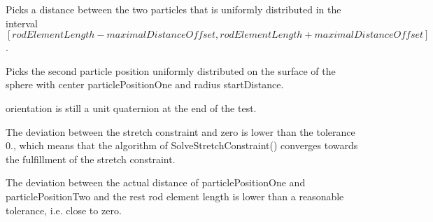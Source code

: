 \begin{DoxyRefList}
Picks a distance between the two particles that is uniformly distributed in the interval $ [rodElementLength - maximalDistanceOffset, rodElementLength + maximalDistanceOffset] $. 



Picks the second particle position uniformly distributed on the surface of the sphere with center {\ttfamily particle\+Position\+One} and radius {\ttfamily start\+Distance}.  
\item[Member \mbox{\hyperlink{class_unit_test___solve_stretch_constraint_ad5754f90b4c4d4be355e60b6180bf975}{Unit\+Test\+\_\+\+Solve\+Stretch\+Constraint.Test\+\_\+\+Solve\+Stretch\+Constraint}} (int iterations, Vector3 particle\+Position\+One, Vector3 particle\+Position\+Two, BSM.\+Quaternion orientation, \mbox{\hyperlink{class_guidewire_sim_1_1_math_helper}{Guidewire\+Sim.\+Math\+Helper}} math\+Helper, \mbox{\hyperlink{class_guidewire_sim_1_1_constraint_solving_step}{Guidewire\+Sim.\+Constraint\+Solving\+Step}} constraint\+Solving\+Step)]\label{requirement__requirement000029}%
%
 {\ttfamily orientation} is still a unit quaternion at the end of the test. 



The deviation between the stretch constraint and zero is lower than the tolerance 0., which means that the algorithm of Solve\+Stretch\+Constraint() converges towards the fulfillment of the stretch constraint. 



The deviation between the actual distance of {\ttfamily particle\+Position\+One} and {\ttfamily particle\+Position\+Two} and the rest rod element length is lower than a reasonable tolerance, i.\+e. close to zero. 
\end{DoxyRefList}